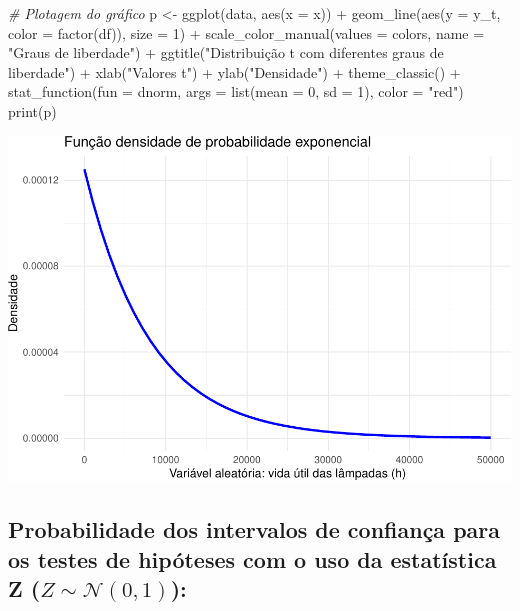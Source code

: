 \documentclass[
]{book}
\newenvironment{Shaded}{\begin{snugshade}}{\end{snugshade}}
\newcommand{\AttributeTok}[1]{\textcolor[rgb]{0.77,0.63,0.00}{#1}}
\newcommand{\CommentTok}[1]{\textcolor[rgb]{0.56,0.35,0.01}{\textit{#1}}}
\newcommand{\DecValTok}[1]{\textcolor[rgb]{0.00,0.00,0.81}{#1}}
\newcommand{\FunctionTok}[1]{\textcolor[rgb]{0.00,0.00,0.00}{#1}}
\newcommand{\NormalTok}[1]{#1}
\newcommand{\OtherTok}[1]{\textcolor[rgb]{0.56,0.35,0.01}{#1}}
\newcommand{\SpecialCharTok}[1]{\textcolor[rgb]{0.00,0.00,0.00}{#1}}
\newcommand{\StringTok}[1]{\textcolor[rgb]{0.31,0.60,0.02}{#1}}
\begin{document}
\begin{Shaded}
\begin{Highlighting}[]
\CommentTok{\# Plotagem do gráfico}
\NormalTok{p }\OtherTok{\textless{}{-}} \FunctionTok{ggplot}\NormalTok{(data, }\FunctionTok{aes}\NormalTok{(}\AttributeTok{x =}\NormalTok{ x)) }\SpecialCharTok{+}
  \FunctionTok{geom\_line}\NormalTok{(}\FunctionTok{aes}\NormalTok{(}\AttributeTok{y =}\NormalTok{ y\_t, }\AttributeTok{color =} \FunctionTok{factor}\NormalTok{(df)), }\AttributeTok{size =} \DecValTok{1}\NormalTok{) }\SpecialCharTok{+}
  \FunctionTok{scale\_color\_manual}\NormalTok{(}\AttributeTok{values =}\NormalTok{ colors, }\AttributeTok{name =} \StringTok{"Graus de liberdade"}\NormalTok{) }\SpecialCharTok{+}
  \FunctionTok{ggtitle}\NormalTok{(}\StringTok{"Distribuição t com diferentes graus de liberdade"}\NormalTok{) }\SpecialCharTok{+}
  \FunctionTok{xlab}\NormalTok{(}\StringTok{"Valores t"}\NormalTok{) }\SpecialCharTok{+}
  \FunctionTok{ylab}\NormalTok{(}\StringTok{"Densidade"}\NormalTok{) }\SpecialCharTok{+}
  \FunctionTok{theme\_classic}\NormalTok{() }\SpecialCharTok{+}
  \FunctionTok{stat\_function}\NormalTok{(}\AttributeTok{fun =}\NormalTok{ dnorm, }\AttributeTok{args =} \FunctionTok{list}\NormalTok{(}\AttributeTok{mean =} \DecValTok{0}\NormalTok{, }\AttributeTok{sd =} \DecValTok{1}\NormalTok{), }\AttributeTok{color =} \StringTok{"red"}\NormalTok{)}
\FunctionTok{print}\NormalTok{(p)}
\end{Highlighting}
\end{Shaded}

\includegraphics{apostila_files/figure-latex/unnamed-chunk-118-1.pdf}

\hfill\break

\hypertarget{probabilidade-dos-intervalos-de-confianuxe7a-para-os-testes-de-hipuxf3teses-com-o-uso-da-estatuxedstica-z-z-sim-mathcaln01}{%
\subsection{\texorpdfstring{Probabilidade dos intervalos de confiança para os testes de hipóteses com o uso da estatística Z (\(Z \sim \mathcal{N}(0,1)\)):}{Probabilidade dos intervalos de confiança para os testes de hipóteses com o uso da estatística Z (Z \textbackslash sim \textbackslash mathcal\{N\}(0,1)):}}\label{probabilidade-dos-intervalos-de-confianuxe7a-para-os-testes-de-hipuxf3teses-com-o-uso-da-estatuxedstica-z-z-sim-mathcaln01}}
\end{document}
